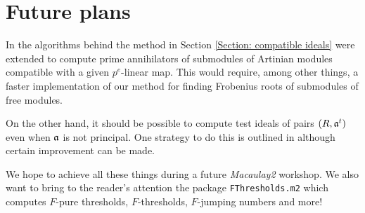 \documentclass{amsart}
\begin{document}
\section{Future plans}

In \cite{KatzmanZhangAlgorithm} the algorithms behind the method in Section \ref{Section: compatible ideals} were extended
to compute prime annihilators of submodules of Artinian modules compatible with a given $p^{e}$-linear map.
This would require, among other things, a faster implementation of our method for finding Frobenius roots of submodules of free modules.

On the other hand, it should be possible to compute test ideals of pairs $(R, \mathfrak{a}^t)$ even when $\mathfrak{a}$ is not principal.  One strategy to do this is outlined in \cite{SchwedeTuckerTestIdealsOfNonPrincipal} although certain improvement can be made.

We hope to achieve all these things during a future \emph{Macaulay2} workshop.  We also want to bring to the reader's attention the package \texttt{FThresholds.m2} which computes $F$-pure thresholds, $F$-thresholds, $F$-jumping numbers and more!



\end{document}
